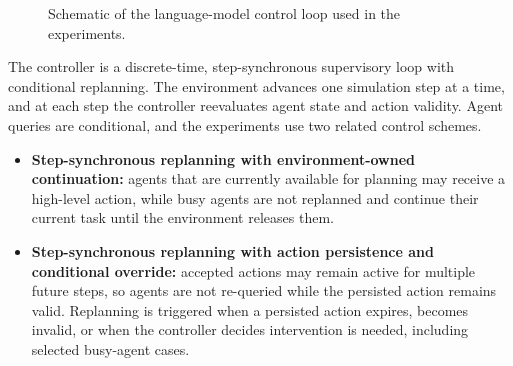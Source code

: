 \begin{figure}[H]
    \centering
    \caption{Schematic of the language-model control loop used in the experiments.}
    \label{fig:lm_control_loop}
\end{figure}

The controller is a discrete-time, step-synchronous supervisory loop with conditional replanning.
The environment advances one simulation step at a time, and at each step the controller reevaluates agent state and action validity.
Agent queries are conditional, and the experiments use two related control schemes.

\begin{itemize}
    \item \textbf{Step-synchronous replanning with environment-owned continuation:} agents that are currently available for planning may receive a high-level action, while busy agents are not replanned and continue their current task until the environment releases them.
    \item \textbf{Step-synchronous replanning with action persistence and conditional override:} accepted actions may remain active for multiple future steps, so agents are not re-queried while the persisted action remains valid. Replanning is triggered when a persisted action expires, becomes invalid, or when the controller decides intervention is needed, including selected busy-agent cases.
\end{itemize}

